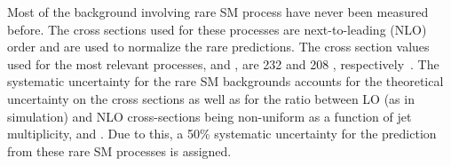 Most of the background involving rare SM process have never been measured
before. The cross sections used for these processes are next-to-leading (NLO)
order and are used to normalize the rare predictions. The cross section values
used for the most relevant processes, \ttW and \ttZ, are 232 \fb and 208 \fb,
respectively~\cite{ttw,ttz}. The systematic uncertainty for the rare SM
backgrounds accounts for the theoretical uncertainty on the cross sections as
well as for the ratio between LO (as in simulation) and NLO cross-sections being
non-uniform as a function of jet multiplicity, \Ht and \met. Due to this, a
50\% systematic uncertainty for the prediction from these rare SM processes is
assigned.
